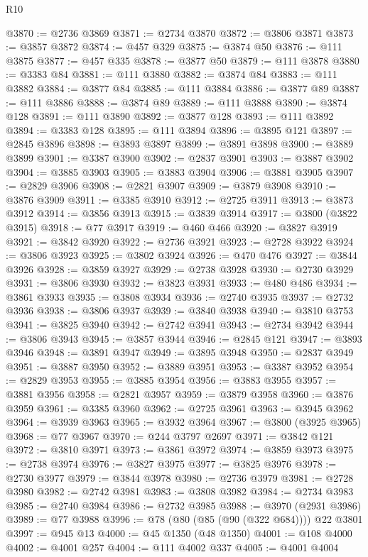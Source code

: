 \begin{lexlean}{R10}
\begin{coremodule}
{{{{{{{{{{{{{{{{{{{{{{{{{{{{{{{{{{{{{{{{{{{{{{{{{{{{{{{{{{{{{{{{{{{{{{{{{{{{{{{{{{{{{{{{{{{{{{{{{{{{{{{{{{{{@3870 := @2736 @3869
@3871 := @2734 @3870
@3872 := @3806 @3871
@3873 := @3857 @3872
@3874 := @457 @329
@3875 := @3874 @50
@3876 := @111 @3875
@3877 := @457 @335
@3878 := @3877 @50
@3879 := @111 @3878
@3880 := @3383 @84
@3881 := @111 @3880
@3882 := @3874 @84
@3883 := @111 @3882
@3884 := @3877 @84
@3885 := @111 @3884
@3886 := @3877 @89
@3887 := @111 @3886
@3888 := @3874 @89
@3889 := @111 @3888
@3890 := @3874 @128
@3891 := @111 @3890
@3892 := @3877 @128
@3893 := @111 @3892
@3894 := @3383 @128
@3895 := @111 @3894
@3896 := @3895 @121
@3897 := @2845 @3896
@3898 := @3893 @3897
@3899 := @3891 @3898
@3900 := @3889 @3899
@3901 := @3387 @3900
@3902 := @2837 @3901
@3903 := @3887 @3902
@3904 := @3885 @3903
@3905 := @3883 @3904
@3906 := @3881 @3905
@3907 := @2829 @3906
@3908 := @2821 @3907
@3909 := @3879 @3908
@3910 := @3876 @3909
@3911 := @3385 @3910
@3912 := @2725 @3911
@3913 := @3873 @3912
@3914 := @3856 @3913
@3915 := @3839 @3914
@3917 := @3800 (@3822 @3915)
@3918 := @77 @3917
@3919 := @460 @466
@3920 := @3827 @3919
@3921 := @3842 @3920
@3922 := @2736 @3921
@3923 := @2728 @3922
@3924 := @3806 @3923
@3925 := @3802 @3924
@3926 := @470 @476
@3927 := @3844 @3926
@3928 := @3859 @3927
@3929 := @2738 @3928
@3930 := @2730 @3929
@3931 := @3806 @3930
@3932 := @3823 @3931
@3933 := @480 @486
@3934 := @3861 @3933
@3935 := @3808 @3934
@3936 := @2740 @3935
@3937 := @2732 @3936
@3938 := @3806 @3937
@3939 := @3840 @3938
@3940 := @3810 @3753
@3941 := @3825 @3940
@3942 := @2742 @3941
@3943 := @2734 @3942
@3944 := @3806 @3943
@3945 := @3857 @3944
@3946 := @2845 @121
@3947 := @3893 @3946
@3948 := @3891 @3947
@3949 := @3895 @3948
@3950 := @2837 @3949
@3951 := @3887 @3950
@3952 := @3889 @3951
@3953 := @3387 @3952
@3954 := @2829 @3953
@3955 := @3885 @3954
@3956 := @3883 @3955
@3957 := @3881 @3956
@3958 := @2821 @3957
@3959 := @3879 @3958
@3960 := @3876 @3959
@3961 := @3385 @3960
@3962 := @2725 @3961
@3963 := @3945 @3962
@3964 := @3939 @3963
@3965 := @3932 @3964
@3967 := @3800 (@3925 @3965)
@3968 := @77 @3967
@3970 := @244 @3797 @2697
@3971 := @3842 @121
@3972 := @3810 @3971
@3973 := @3861 @3972
@3974 := @3859 @3973
@3975 := @2738 @3974
@3976 := @3827 @3975
@3977 := @3825 @3976
@3978 := @2730 @3977
@3979 := @3844 @3978
@3980 := @2736 @3979
@3981 := @2728 @3980
@3982 := @2742 @3981
@3983 := @3808 @3982
@3984 := @2734 @3983
@3985 := @2740 @3984
@3986 := @2732 @3985
@3988 := @3970 (@2931 @3986)
@3989 := @77 @3988
@3996 := @78 (@80 (@85 (@90 (@322 @684)))) @22 @3801
@3997 := @945 @13
@4000 := @45 @1350 (@48 @1350)
@4001 := @108 @4000
@4002 := @4001 @257
@4004 := @111 @4002 @337
@4005 := @4001 @4004
}}}}}}}}}}}}}}}}}}}}}}}}}}}}}}}}}}}}}}}}}}}}}}}}}}}}}}}}}}}}}}}}}}}}}}}}}}}}}}}}}}}}}}}}}}}}}}}}}}}}}}}}}}}}
\end{coremodule}
\end{lexlean}
